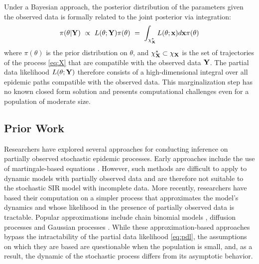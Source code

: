 \documentclass[11pt]{article}
\begin{document}
	Under a Bayesian approach, the posterior distribution of the parameters given the observed data is formally related to the joint posterior via integration:
	\begin{equation}
		\label{eq:pdl}
		\pi(\theta|\mathbf{Y}) 
		\, \, \propto \, \, L(\theta; \mathbf{Y})\pi(\theta) \, \, = \, \, \int_{\chi^*_{\mathbf{X}}} L(\theta; \mathbf{x}) d\mathbf{x} \pi(\theta)
	\end{equation}
	where $\pi(\theta)$ is the prior distribution on $\theta$, and
	$\chi^*_{\mathbf{X}} \subset \chi_{\mathbf{X}}$ is the set of trajectories of the process \eqref{eq:X} that are compatible with the observed data $\mathbf{Y}$.
	The partial data likelihood $L(\theta; \mathbf{Y})$ therefore consists of a high-dimensional integral over all epidemic paths compatible with the observed data. This marginalization step has no known closed form solution and presents computational challenges even for a population of moderate size.
	
	\subsection{Prior Work}
	\label{sec:pre}
	Researchers have explored several approaches for conducting inference on partially observed stochastic epidemic processes. Early approaches include the use of martingale-based equations \cite{Becker.1977, Watson.1981, Sudbury.1985}. However, such methods are difficult to apply to dynamic models with partially observed data and are therefore not suitable to the stochastic SIR model with incomplete data.
	More recently, researchers have based their computation on a simpler process that approximates the model's dynamics and whose likelihood in the presence of partially observed data is tractable. Popular approximations include chain binomial models \cite{Greenwood.1931, Abbey.1952}, diffusion processes \cite{Cauchemez.2008, Fintzi.2020} and Gaussian processes \cite{Jandarov.2014}. While these approximation-based approaches bypass the intractability of the partial data likelihood \ref{eq:pdl}, the assumptions on which they are based are questionable when the population is small, and, as a result, the dynamic of the stochastic process differs from its asymptotic behavior.
	
\end{document}
